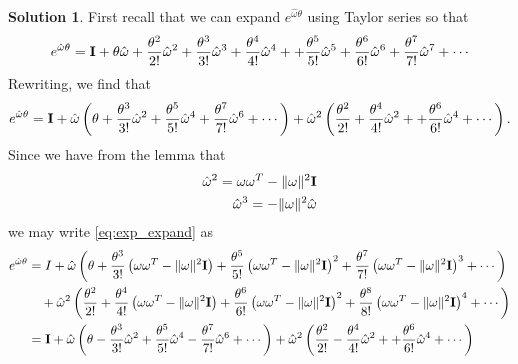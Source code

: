 \documentclass[]{article}
\theoremstyle{definition}
\newtheorem{solution}{Solution}
\begin{document}
\begin{solution}
	First recall that we can expand $e^{\hat{\omega}\theta}$ using Taylor series so that 
	\begin{align}
		e^{\hat{\omega}\theta} = \textbf{I} + \theta \hat{\omega} + \frac{\theta^2}{2!}\hat{\omega}^2 + \frac{\theta^3}{3!}\hat{\omega}^3 + \frac{\theta^4}{4!}\hat{\omega}^4 + + \frac{\theta^5}{5!}\hat{\omega}^5 + \frac{\theta^6}{6!}\hat{\omega}^6 + \frac{\theta^7}{7!}\hat{\omega}^7 + \cdots
	\end{align}
	Rewriting, we find that
	\begin{align}
	e^{\hat{\omega}\theta} = \textbf{I} + \hat{\omega} \left(\theta + \frac{\theta^3}{3!}\hat{\omega}^2  + \frac{\theta^5}{5!}\hat{\omega}^4 + \frac{\theta^7}{7!}\hat{\omega}^6  + \cdots \right)  +
	\hat{\omega}^2 \left( \frac{\theta^2}{2!} + \frac{\theta^4}{4!}\hat{\omega}^2 + + \frac{\theta^6}{6!}\hat{\omega}^4  + \cdots \right).
	\label{eq:exp_expand}
	\end{align}
	Since we have from the lemma that 
	\begin{subequations}
		\begin{align}
		\hat{\omega}^2 = \omega \omega^T - \|\omega\|^2 \textbf{I}  \\
		\hat{\omega}^3 = - \|\omega\|^2 \hat{\omega}
		\end{align}
	\end{subequations}
	we may write \eqref{eq:exp_expand} as 
	\begin{align}
	e^{\hat{\omega}\theta} &= I + \hat{\omega} \left(\theta + \frac{\theta^3}{3!}\left(\omega \omega^T - \|\omega\|^2 \identity\right)  + \frac{\theta^5}{5!}\left(\omega \omega^T - \|\omega\|^2 \identity\right)^2 + \frac{\theta^7}{7!}\left(\omega \omega^T - \|\omega\|^2 \identity\right)^3  + \cdots \right) \nonumber \\
	&\quad +
	\hat{\omega}^2 \left( \frac{\theta^2}{2!} + \frac{\theta^4}{4!}\left(\omega \omega^T - \|\omega\|^2 \identity \right) + \frac{\theta^6}{6!}\left(\omega \omega^T - \|\omega\|^2 \identity \right)^2  + \frac{\theta^8}{8!}\left(\omega \omega^T - \|\omega\|^2 \identity\right)^4 + \cdots \right) \nonumber \\
	&= \identity + \hat{\omega} \left(\theta - \frac{\theta^3}{3!}\hat{\omega}^2  + \frac{\theta^5}{5!}\hat{\omega}^4 - \frac{\theta^7}{7!}\hat{\omega}^6  + \cdots \right)  +
	\hat{\omega}^2 \left( \frac{\theta^2}{2!} - \frac{\theta^4}{4!}\hat{\omega}^2 + + \frac{\theta^6}{6!}\hat{\omega}^4  + \cdots \right)
	\label{eq:exp_lemma}

\end{align}
\end{solution}
\end{document}

